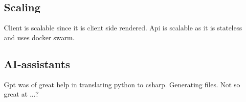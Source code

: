 \subsection{Scaling}

Client is scalable since it is client side rendered.
Api is scalable as it is stateless and uses docker swarm.

\subsection{AI-assistants}

Gpt was of great help in translating python to csharp.
Generating files.
Not so great at ...?